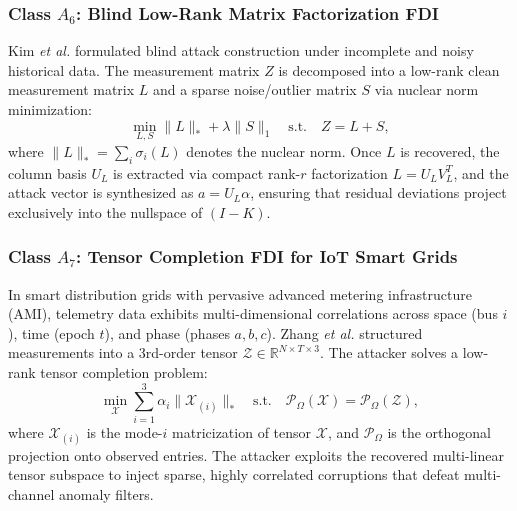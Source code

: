 \documentclass[journal,compsoc]{IEEEtran}
\begin{document}
\subsubsection{Class $A_6$: Blind Low-Rank Matrix Factorization FDI \cite{ref48, ref39, ref41, ref49}}
Kim \textit{et al.} \cite{ref48} formulated blind attack construction under incomplete and noisy historical data. The measurement matrix $Z$ is decomposed into a low-rank clean measurement matrix $L$ and a sparse noise/outlier matrix $S$ via nuclear norm minimization:
\begin{equation}
    \min_{L, S} \|L\|_* + \lambda \|S\|_1 \quad \text{s.t.} \quad Z = L + S,
\end{equation}
where $\|L\|_* = \sum_i \sigma_i(L)$ denotes the nuclear norm. Once $L$ is recovered, the column basis $U_L$ is extracted via compact rank-$r$ factorization $L = U_L V_L^T$, and the attack vector is synthesized as $a = U_L \alpha$, ensuring that residual deviations project exclusively into the nullspace of $(I - K)$.

\subsubsection{Class $A_7$: Tensor Completion FDI for IoT Smart Grids \cite{ref59, ref37}}
In smart distribution grids with pervasive advanced metering infrastructure (AMI), telemetry data exhibits multi-dimensional correlations across space (bus $i$), time (epoch $t$), and phase (phases $a, b, c$). Zhang \textit{et al.} \cite{ref59} structured measurements into a 3rd-order tensor $\mathcal{Z} \in \mathbb{R}^{N \times T \times 3}$. The attacker solves a low-rank tensor completion problem:
\begin{equation}
    \min_{\mathcal{X}} \sum_{i=1}^3 \alpha_i \|\mathcal{X}_{(i)}\|_* \quad \text{s.t.} \quad \mathcal{P}_\Omega(\mathcal{X}) = \mathcal{P}_\Omega(\mathcal{Z}),
\end{equation}
where $\mathcal{X}_{(i)}$ is the mode-$i$ matricization of tensor $\mathcal{X}$, and $\mathcal{P}_\Omega$ is the orthogonal projection onto observed entries. The attacker exploits the recovered multi-linear tensor subspace to inject sparse, highly correlated corruptions that defeat multi-channel anomaly filters.
\end{document}
